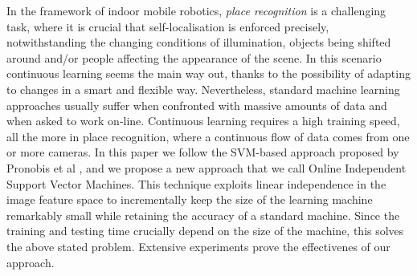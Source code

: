 In the framework of indoor mobile robotics, \emph{place recognition}
is a  challenging task,
where it is crucial that self-localisation is enforced precisely,
notwithstanding the changing conditions of illumination, objects being
shifted around and/or people affecting
the appearance of the scene.
In this scenario
continuous learning seems the main way out, thanks to the possibility of
adapting to changes in a smart and flexible way. Nevertheless,
standard machine learning approaches usually suffer when confronted
with massive amounts of data and when asked to work on-line.
Continuous learning requires a high training speed, all the more
in place recognition, where a continuous flow of data comes from one
or more cameras.
In this paper we follow the SVM-based approach proposed by Pronobis et al \cite{pronobis:iros06},
and we propose a new approach  that we call
Online Independent Support Vector Machines. This technique exploits
linear independence in the image feature space to incrementally keep
the size of the learning machine remarkably small while retaining the
accuracy of a standard machine. Since the training and testing time
crucially depend on the size of the machine, this solves the above
stated problem. 
Extensive experiments prove the effectivenes of our approach.

